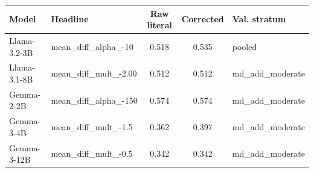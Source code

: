 \begin{tabular}{llccl}
\toprule
Model & Headline & Raw literal & Corrected & Val. stratum \\
\midrule
Llama-3.2-3B & mean_diff_alpha_-10 & 0.518 & 0.535 & pooled \\
Llama-3.1-8B & mean_diff_mult_-2.00 & 0.512 & 0.512 & md_add_moderate \\
Gemma-2-2B & mean_diff_alpha_-150 & 0.574 & 0.574 & md_add_moderate \\
Gemma-3-4B & mean_diff_mult_-1.5 & 0.362 & 0.397 & md_add_moderate \\
Gemma-3-12B & mean_diff_mult_-0.5 & 0.342 & 0.342 & md_add_moderate \\
\bottomrule
\end{tabular}
